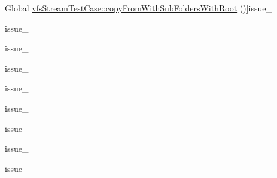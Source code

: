 \begin{DoxyRefList}
%
Global \mbox{\hyperlink{classorg_1_1bovigo_1_1vfs_1_1vfs_stream_test_case_a36ad60211b195bf34ae08303cd362c68}{vfs\+Stream\+Test\+Case\+:\+:copy\+From\+With\+Sub\+Folders\+With\+Root}} ()]issue\+\_  
\item[\label{test__test000097}%
\Hypertarget{test__test000097}%
Global \mbox{\hyperlink{classorg_1_1bovigo_1_1vfs_1_1vfs_stream_test_case_af82c08f20d3a551ca3ce08699813e8d5}{vfs\+Stream\+Test\+Case\+:\+:create\+Arrays\+Are\+Turned\+Into\+Subdirectories}} ()]issue\+\_  
\item[\label{test__test000098}%
\Hypertarget{test__test000098}%
Global \mbox{\hyperlink{classorg_1_1bovigo_1_1vfs_1_1vfs_stream_test_case_a58d40442b1a3870abcbad994d8a300bc}{vfs\+Stream\+Test\+Case\+:\+:create\+Arrays\+Are\+Turned\+Into\+Subdirectories\+Of\+Root}} ()]issue\+\_  
\item[\label{test__test000104}%
\Hypertarget{test__test000104}%
Global \mbox{\hyperlink{classorg_1_1bovigo_1_1vfs_1_1vfs_stream_test_case_ae59071f7590a254e23ff1575acd3205f}{vfs\+Stream\+Test\+Case\+:\+:create\+Casts\+Numeric\+Directories\+To\+Strings}} ()]issue\+\_  
\item[\label{test__test000105}%
\Hypertarget{test__test000105}%
Global \mbox{\hyperlink{classorg_1_1bovigo_1_1vfs_1_1vfs_stream_test_case_a4d7e4112fd99211e6097543bc9ac88f2}{vfs\+Stream\+Test\+Case\+:\+:create\+Casts\+Numeric\+Directories\+To\+Strings\+With\+Root}} ()]issue\+\_  
\item[\label{test__test000102}%
\Hypertarget{test__test000102}%
Global \mbox{\hyperlink{classorg_1_1bovigo_1_1vfs_1_1vfs_stream_test_case_ae02dd7485249f19a71284f9d961d8837}{vfs\+Stream\+Test\+Case\+:\+:create\+Strings\+Are\+Turned\+Into\+Files\+With\+Content}} ()]issue\+\_  
\item[\label{test__test000103}%
\Hypertarget{test__test000103}%
Global \mbox{\hyperlink{classorg_1_1bovigo_1_1vfs_1_1vfs_stream_test_case_a0f5189d2be01a77535ec18ed9b019e79}{vfs\+Stream\+Test\+Case\+:\+:create\+Strings\+Are\+Turned\+Into\+Files\+With\+Content\+With\+Root}} ()]issue\+\_  
\item[\label{test__test000099}%
\Hypertarget{test__test000099}%
Global \mbox{\hyperlink{classorg_1_1bovigo_1_1vfs_1_1vfs_stream_test_case_a626fd7f4d53ef3f8a8fe364d119e4d4e}{vfs\+Stream\+Test\+Case\+:\+:create\+Throws\+Exception\+If\+No\+Base\+Dir\+Given\+And\+No\+Root\+Set}} ()]issue\+\_    
\item[\label{test__test000100}%
\Hypertarget{test__test000100}%
Global \mbox{\hyperlink{classorg_1_1bovigo_1_1vfs_1_1vfs_stream_test_case_a3c3bb73015011fc8d08fba2c4855ad6a}{vfs\+Stream\+Test\+Case\+:\+:create\+Works\+Recursively}} ()]issue\+\_  

\end{DoxyRefList}
